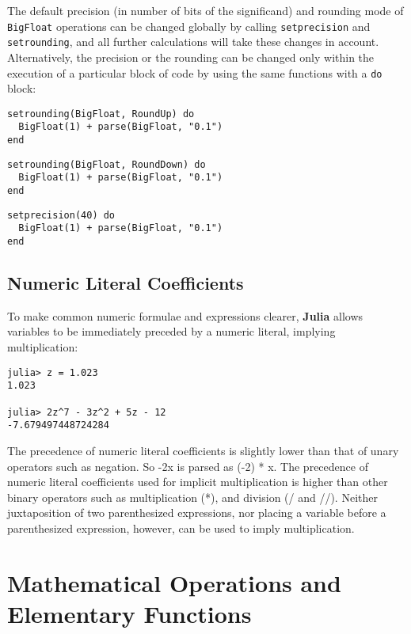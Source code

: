 \documentclass[
]{article}
\begin{document}
The default precision (in number of bits of the significand) and
rounding mode of \texttt{BigFloat} operations can be changed globally by
calling \texttt{setprecision} and \texttt{setrounding}, and all further
calculations will take these changes in account. Alternatively, the
precision or the rounding can be changed only within the execution of a
particular block of code by using the same functions with a \texttt{do}
block:

\begin{verbatim}
setrounding(BigFloat, RoundUp) do
  BigFloat(1) + parse(BigFloat, "0.1")
end
\end{verbatim}

\begin{verbatim}
setrounding(BigFloat, RoundDown) do
  BigFloat(1) + parse(BigFloat, "0.1")
end
\end{verbatim}

\begin{verbatim}
setprecision(40) do
  BigFloat(1) + parse(BigFloat, "0.1")
end
\end{verbatim}

\hypertarget{numeric-literal-coefficients}{%
\subsection{Numeric Literal
Coefficients}\label{numeric-literal-coefficients}}

To make common numeric formulae and expressions clearer, \textbf{Julia}
allows variables to be immediately preceded by a numeric literal,
implying multiplication:

\begin{verbatim}
julia> z = 1.023
1.023

julia> 2z^7 - 3z^2 + 5z - 12
-7.679497448724284
\end{verbatim}

The precedence of numeric literal coefficients is slightly lower than
that of unary operators such as negation. So -2x is parsed as (-2) * x.
The precedence of numeric literal coefficients used for implicit
multiplication is higher than other binary operators such as
multiplication (*), and division (/ and //). Neither juxtaposition of
two parenthesized expressions, nor placing a variable before a
parenthesized expression, however, can be used to imply multiplication.

\newpage

\hypertarget{mathematical-operations-and-elementary-functions}{%
\section{Mathematical Operations and Elementary
Functions}\label{mathematical-operations-and-elementary-functions}}
\end{document}

